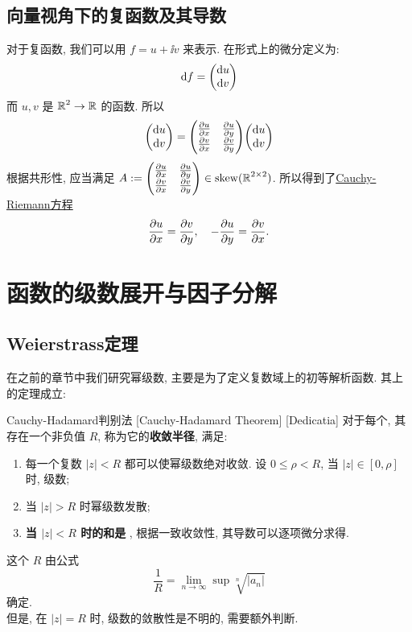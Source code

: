     \subsection{向量视角下的复函数及其导数}

        对于复函数, 我们可以用 \(f=u+\ii v\) 来表示. 在形式上的微分定义为: 
        \[\dd{f} = \mqty(\dd{u}\\ \dd{v})\]
        而 \(u,v\) 是 \(\operatorname{\mathbb{R}}^2\to\operatorname{\mathbb{R}}\) 的函数. 所以
        \[\mqty(\dd{u}\\ \dd{v})=\mqty(\pdv{u}{x} & \pdv{u}{y} \\ \pdv{v}{x} & \pdv{v}{y})\mqty(\dd{u}\\ \dd{v})\]
        根据共形性, 应当满足 \(A:=\mqty(\pdv{u}{x} & \pdv{u}{y} \\ \pdv{v}{x} & \pdv{v}{y})\in\operatorname{skew}(\R^{2\times 2})\). 所以得到了\hyperref[thm:Cauchy-Riemann-Equation]{Cauchy-Riemann方程}
        \[\pdv{u}{x}=\pdv{v}{y},\quad -\pdv{u}{y}=\pdv{v}{x}.\]

\section{函数的级数展开与因子分解}
    
    \subsection{Weierstrass定理}
        
        在之前的章节中我们研究幂级数, 主要是为了定义复数域上的初等解析函数. 其上的定理成立: 

        \begin{thm}
            {Cauchy-Hadamard判别法}
            [Cauchy-Hadamard Theorem]
            [Dedicatia]
            对于每个\PowerSeries, 其存在一个非负值 \(R\), 称为它的\textbf{收敛半径}, 满足: 
            \begin{enumerate}
                \item 每一个复数 \(|z|<R\) 都可以使幂级数绝对收敛. 设 \(0\leqslant\rho <R\), 当 \(|z|\in[0,\rho]\) 时, 级数\UniformConvergent{}; 
                \item 当 \(|z|>R\) 时幂级数发散; 
                \item \textbf{当 \(|z|<R\) 时的和是\Analytic{} }, 根据一致收敛性, 其导数可以逐项微分求得. 
            \end{enumerate}
            这个 \(R\) 由公式
            \[\frac{1}{R}=\lim_{n\to \infty}\sup\sqrt[n]{|a_n|}\]
            确定. \\
            但是, 在 \(|z|=R\) 时, 级数的敛散性是不明的, 需要额外判断. 
        \end{thm}

